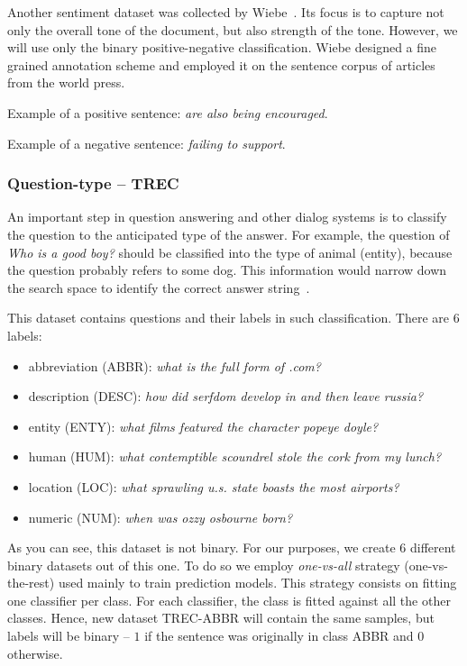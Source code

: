     Another sentiment dataset was collected by Wiebe~\cite{wiebe2005annotating}.
    Its focus is to capture not only the overall tone of the document, but also strength of the tone.
    However, we will use only the binary positive-negative classification.
    Wiebe designed a fine grained annotation scheme and employed it on the sentence corpus of articles from the world press.
    
    Example of a positive sentence:
    \emph{are also being encouraged}.
    
    Example of a negative sentence:
    \emph{failing to support}. 

    
    \subsubsection{Question-type -- TREC}\label{sec:TREC}
    
    An important step in question answering and other dialog systems is to classify the question to the anticipated type of the answer. 
    For example, the question of \emph{Who is a good boy?} should be classified into the type of animal (entity), because the question probably refers to some dog.  
    This information would narrow down the search space to identify the correct answer string~\cite{huang2008question}. 
    
    This dataset contains questions and their labels in such classification.
    There are $6$ labels: 
    
    \begin{itemize}
        \item abbreviation (ABBR): \emph{what is the full form of .com?}
        \item description (DESC): \emph{how did serfdom develop in and then leave russia?}
        \item entity (ENTY): \emph{what films featured the character popeye doyle?}
        \item human (HUM): \emph{what contemptible scoundrel stole the cork from my lunch?}
        \item location (LOC): \emph{what sprawling u.s. state boasts the most airports?}
        \item numeric (NUM): \emph{when was ozzy osbourne born?}
    \end{itemize}
    
    As you can see, this dataset is not binary. 
    For our purposes, we create $6$ different binary datasets out of this one.
    To do so we employ \emph{one-vs-all} strategy (one-vs-the-rest) used mainly to train prediction models.
    This strategy consists on fitting one classifier per class. 
    For each classifier, the class is fitted against all the other classes. 
    Hence, new dataset TREC-ABBR will contain the same samples, but labels will be binary -- $1$ if the sentence was originally in class ABBR and $0$ otherwise.
    
